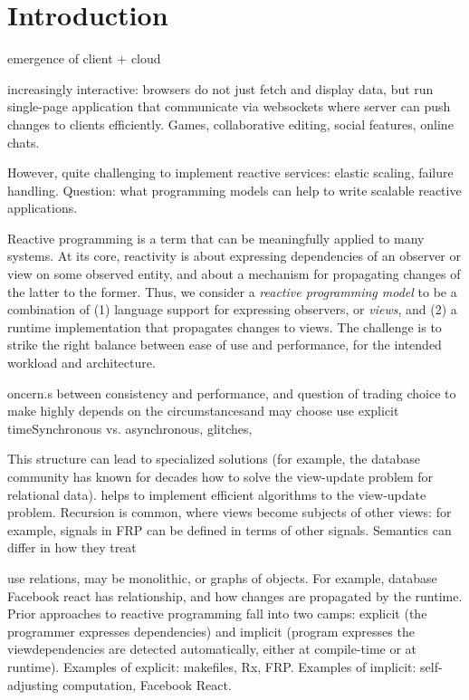 \section{Introduction}

emergence of client + cloud


increasingly interactive: browsers do not just fetch and display data, but run single-page application that communicate via websockets where server can push changes to clients efficiently. Games, collaborative editing, social features, online chats.

However, quite challenging to implement reactive services: elastic scaling, failure handling. Question: what programming models can help to write scalable reactive applications. 


Reactive programming is a term that can be meaningfully applied to many systems. At its core, reactivity is about expressing dependencies of an observer or view on some observed entity, and about a mechanism for propagating changes of the latter to the former. Thus, we consider a \emph{reactive programming model} to be a combination of (1) language support for expressing observers, or \emph{views}, and (2) a runtime implementation that propagates changes to views. The challenge is to strike the right balance between ease of use and performance, for the intended workload and architecture.



oncern.s between consistency and performance, and question of trading  choice to make highly depends on the circumstancesand may choose use explicit timeSynchronous vs. asynchronous, glitches, 
 
This structure can lead to specialized solutions (for example, the database community has known for decades how to solve the view-update problem for relational data). helps to implement efficient algorithms  to the view-update problem. Recursion is common, where views become subjects of other views: for example, signals in FRP can be defined in terms of other signals. Semantics can differ in how they treat 


use relations, may be monolithic, or graphs of objects. For example, database Facebook react has 
relationship, and how changes are propagated by the runtime. Prior approaches to reactive programming fall into two camps: explicit (the programmer expresses dependencies) and implicit (program expresses the viewdependencies are detected automatically, either at compile-time or at runtime).
Examples of explicit: makefiles, Rx, FRP. Examples of implicit: self-adjusting computation, Facebook React.



